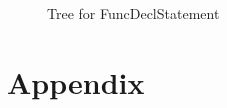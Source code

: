 \documentclass[a4paper, 12pt]{article}
\begin{document}
\begin{figure}[h]
    \centering
    \caption{Tree for FuncDeclStatement}
\end{figure}

\section{Appendix}
\end{document}
